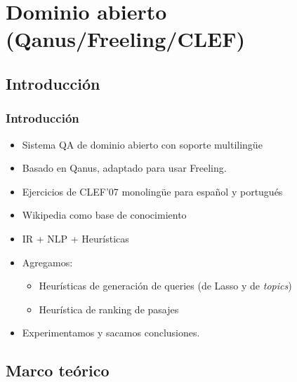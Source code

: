 \fontsize{9.5pt}{7.2}\selectfont

\section{Dominio abierto (Qanus/Freeling/CLEF)}

\subsection{Introducción}

\begin{frame}
\frametitle{Introducción}
  \begin{itemize}
    \item Sistema QA de dominio abierto con soporte multilingüe
    \item Basado en Qanus, adaptado para usar Freeling.
    \item Ejercicios de CLEF'07 monolingüe para español y portugués
    \item Wikipedia como base de conocimiento
    \item IR + NLP + Heurísticas
    \item Agregamos: 
    \begin{itemize}
        \item Heurísticas de generación de queries (de Lasso y de \textit{topics})
        \item Heurística de ranking de pasajes
    \end{itemize}
    \item Experimentamos y sacamos conclusiones.
  \end{itemize}

\end{frame}

\subsection{Marco teórico}


